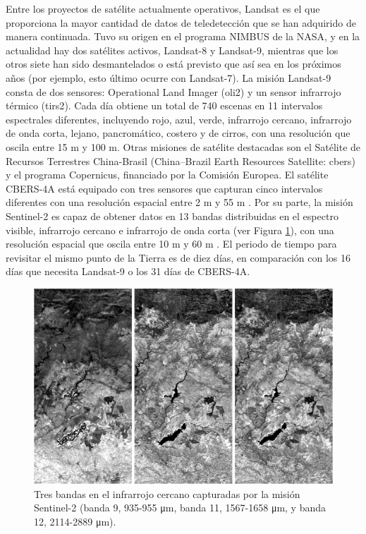 Entre los proyectos de satélite actualmente operativos, Landsat es el que proporciona la mayor cantidad de datos de teledetección que se han adquirido de manera continuada. Tuvo su origen en el programa NIMBUS de la NASA, y en la actualidad hay dos satélites activos, Landsat-8 y Landsat-9, mientras que los otros siete han sido desmantelados o está previsto que así sea en los próximos años (por ejemplo, esto último ocurre con Landsat-7). La misión Landsat-9 consta de dos sensores: Operational Land Imager (\acrshort{oli2}) y un sensor infrarrojo térmico (\acrshort{tirs2}). Cada día obtiene un total de 740 escenas en 11 intervalos espectrales diferentes, incluyendo rojo, azul, verde, infrarrojo cercano, infrarrojo de onda corta, lejano, pancromático, costero y de cirros, con una resolución que oscila entre 15 \si{\meter} y 100 \si{\meter}. Otras misiones de satélite destacadas son el Satélite de Recursos Terrestres China-Brasil (China–Brazil Earth Resources Satellite: \acrshort{cbers}) y el programa Copernicus, financiado por la Comisión Europea. El satélite CBERS-4A está equipado con tres sensores que capturan cinco intervalos diferentes con una resolución espacial entre 2 \si{\meter} y 55 \si{\meter} \cite{instituto_nacional_de_pesquisas_espaciais_inpecbers_2019}. Por su parte, la misión Sentinel-2 es capaz de obtener datos en 13 bandas distribuidas en el espectro visible, infrarrojo cercano e infrarrojo de onda corta (ver Figura \ref{fig:sentinel2_spanish}), con una resolución espacial que oscila entre 10 \si{\meter} y 60 \si{\meter} \cite{european_environment_agency_eu_2017}. El periodo de tiempo para revisitar el mismo punto de la Tierra es de diez días, en comparación con los 16 días que necesita Landsat-9 o los 31 días de CBERS-4A.

\begin{figure}[!ht]
	\includegraphics{figs/introduction/sentinel2_bands.png}
	\caption{Tres bandas en el infrarrojo cercano capturadas por la misión Sentinel-2 (banda 9, 935-955 \si{\micro\meter}, banda 11, 1567-1658 \si{\micro\meter}, y banda 12, 2114-2889 \si{\micro\meter}). }
    \label{fig:sentinel2_spanish}
\end{figure} 

